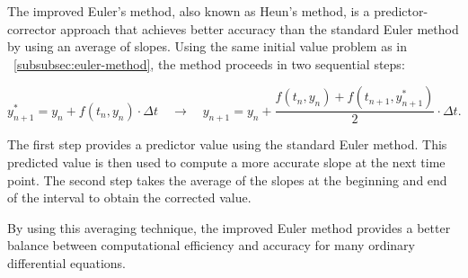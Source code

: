 The improved Euler's method, also known as Heun's method, is a predictor-corrector approach that achieves better accuracy than the standard Euler method by using an average of slopes.
Using the same initial value problem as in ~\ref{subsubsec:euler-method}, the method proceeds in two sequential steps:

\[
y_{n+1}^* = y_n + f(t_n, y_n) \cdot \Delta t
\quad \rightarrow \quad
y_{n+1} = y_n + \frac{f(t_n, y_n) + f(t_{n+1}, y_{n+1}^*)}{2} \cdot \Delta t.
\]

The first step provides a predictor value using the standard Euler method.
This predicted value is then used to compute a more accurate slope at the next time point.
The second step takes the average of the slopes at the beginning and end of the interval to obtain the corrected value.

By using this averaging technique, the improved Euler method provides a better balance between computational efficiency and accuracy for many ordinary differential equations.